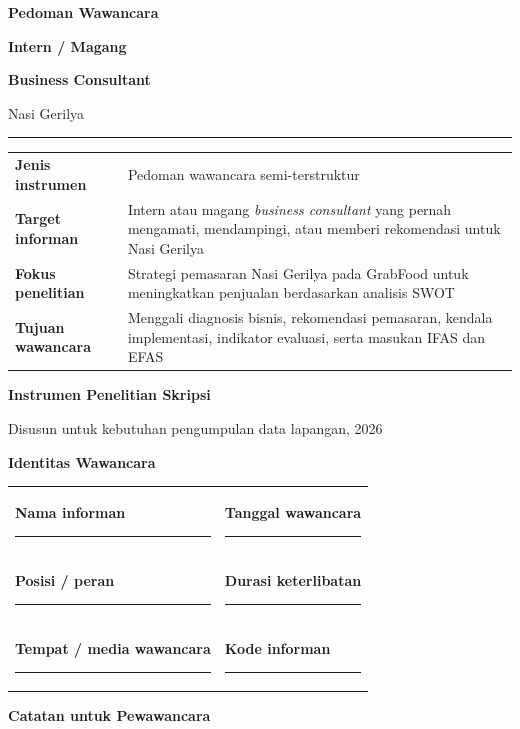 \documentclass[10pt,a4paper]{article}
\newcommand{\sectionbar}[1]{%
  \Needspace{4\baselineskip}
  \vspace{4mm}
  \noindent\colorbox{Soft}{%
    \parbox{\dimexpr\linewidth-2\fboxsep\relax}{%
      \large\bfseries\textcolor{Primary}{#1}
    }%
  }\par\vspace{2mm}
}
\newcommand{\metadatafield}[1]{%
  \textbf{\textcolor{Primary}{#1}}\par
  \textcolor{LineGray}{\rule{\linewidth}{0.35pt}}\par\vspace{2.4mm}
}
\begin{document}
\begin{titlepage}
\thispagestyle{empty}
\vspace*{9mm}
{\Huge\bfseries\textcolor{Primary}{Pedoman Wawancara}}\par
{\Huge\bfseries\textcolor{Primary}{Intern / Magang}}\par
{\Huge\bfseries\textcolor{Primary}{Business Consultant}}\par
\vspace{3mm}
{\Large\textcolor{Accent}{Nasi Gerilya}}\par
\vspace{7mm}
\textcolor{Accent}{\rule{0.92\linewidth}{1.4pt}}\par
\vspace{8mm}

\begin{tabularx}{0.92\linewidth}{>{\bfseries\color{Primary}}p{35mm}Y}
Jenis instrumen & Pedoman wawancara semi-terstruktur \\
Target informan & Intern atau magang \textit{business consultant} yang pernah mengamati, mendampingi, atau memberi rekomendasi untuk Nasi Gerilya \\
Fokus penelitian & Strategi pemasaran Nasi Gerilya pada GrabFood untuk meningkatkan penjualan berdasarkan analisis SWOT \\
Tujuan wawancara & Menggali diagnosis bisnis, rekomendasi pemasaran, kendala implementasi, indikator evaluasi, serta masukan IFAS dan EFAS \\
\end{tabularx}

\vfill
{\large\bfseries\textcolor{Primary}{Instrumen Penelitian Skripsi}}\par
{\normalsize\textcolor{TextGray}{Disusun untuk kebutuhan pengumpulan data lapangan, 2026}}\par
\end{titlepage}

\sectionbar{Identitas Wawancara}

\begin{tabularx}{\linewidth}{X X}
\metadatafield{Nama informan} & \metadatafield{Tanggal wawancara} \\
\metadatafield{Posisi / peran} & \metadatafield{Durasi keterlibatan} \\
\metadatafield{Tempat / media wawancara} & \metadatafield{Kode informan} \\
\end{tabularx}

\sectionbar{Catatan untuk Pewawancara}
\end{document}
